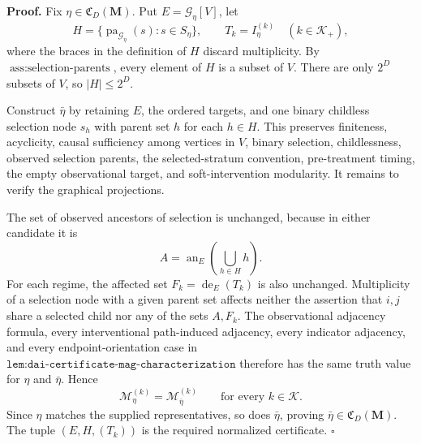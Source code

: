 \textbf{Proof.}
Fix \(\eta\in\mathfrak C_D(\mathbf M)\).  Put \(E=\mathcal G_\eta[V]\), let
\[
H=\{\operatorname{pa}_{\mathcal G_\eta}(s):s\in S_\eta\},
\qquad
T_k=I_\eta^{(k)}\quad(k\in\mathcal K_+),
\]
where the braces in the definition of \(H\) discard multiplicity.  By \(\operatorname{ass{:}selection\text{-}parents}\), every element of \(H\) is a subset of \(V\).  There are only \(2^D\) subsets of \(V\), so \(|H|\le 2^D\).

Construct \(\bar\eta\) by retaining \(E\), the ordered targets, and one binary childless selection node \(s_h\) with parent set \(h\) for each \(h\in H\).  This preserves finiteness, acyclicity, causal sufficiency among vertices in \(V\), binary selection, childlessness, observed selection parents, the selected-stratum convention, pre-treatment timing, the empty observational target, and soft-intervention modularity.  It remains to verify the graphical projections.

The set of observed ancestors of selection is unchanged, because in either candidate it is
\[
A=\operatorname{an}_E\!\left(\bigcup_{h\in H}h\right).
\]
For each regime, the affected set \(F_k=\operatorname{de}_E(T_k)\) is also unchanged.  Multiplicity of a selection node with a given parent set affects neither the assertion that \(i,j\) share a selected child nor any of the sets \(A,F_k\).  The observational adjacency formula, every interventional path-induced adjacency, every indicator adjacency, and every endpoint-orientation case in \(\texttt{lem:dai-certificate-mag-characterization}\) therefore has the same truth value for \(\eta\) and \(\bar\eta\).  Hence
\[
\mathcal M_{\eta}^{(k)}=\mathcal M_{\bar\eta}^{(k)}
\qquad\text{for every }k\in\mathcal K.
\]
Since \(\eta\) matches the supplied representatives, so does \(\bar\eta\), proving \(\bar\eta\in\mathfrak C_D(\mathbf M)\).  The tuple \((E,H,(T_k))\) is the required normalized certificate. \(\square\)